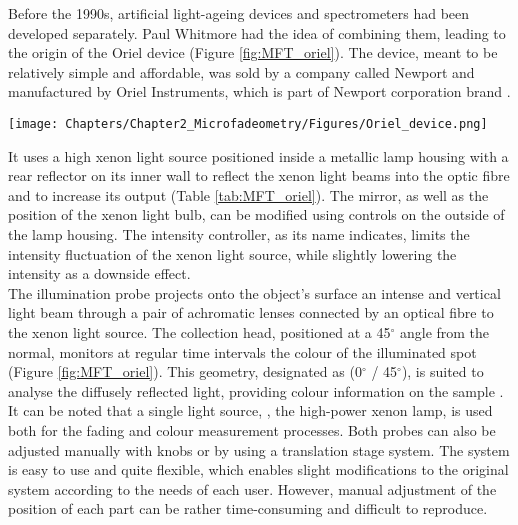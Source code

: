 Before the 1990s, artificial light-ageing devices and spectrometers had been developed separately. Paul Whitmore had the idea of combining them, leading to the origin of the Oriel device (Figure \ref{fig:MFT_oriel}). The device, meant to be relatively simple and affordable, was sold by a company called Newport and manufactured by Oriel Instruments, which is part of Newport corporation brand \citep[52–4]{del_hoyo-melendez_study_2010}.\\

\begin{figure*}
\centering
\texttt{[image: Chapters/Chapter2\_Microfadeometry/Figures/Oriel\_device.png]}
\caption[\hspace{0.3cm}The Oriel MFT]{Schematic representation of the Oriel MFT (adapted from \citet[Fig. 1]{whitmore_predicting_1999}).}
\label{fig:MFT_oriel}
\end{figure*}


It uses a high xenon light source positioned inside a metallic lamp housing with a rear reflector on its inner wall to reflect the xenon light beams into the optic fibre and to increase its output (Table \ref{tab:MFT_oriel}). The mirror, as well as the position of the xenon light bulb, can be modified using controls on the outside of the lamp housing. The intensity controller, as its name indicates, limits the intensity fluctuation of the xenon light source, while slightly lowering the intensity as a downside effect.\\

The illumination probe projects onto the object's surface an intense and vertical light beam through a pair of achromatic lenses connected by an optical fibre to the xenon light source. The collection head, positioned at a 45$^\circ$ angle from the normal, monitors at regular time intervals the colour of the illuminated spot (Figure \ref{fig:MFT_oriel}). This geometry, designated as (0$^\circ$ / 45$^\circ$), is suited to analyse the diffusely reflected light, providing colour information on the sample \citep[398]{whitmore_predicting_1999}. It can be noted that a single light source, \ie, the high-power xenon lamp, is used both for the fading and colour measurement processes. Both probes can also be adjusted manually with knobs or by using a translation stage system. The system is easy to use and quite flexible, which enables slight modifications to the original system according to the needs of each user. However, manual adjustment of the position of each part can be rather time-consuming and difficult to reproduce.\\


